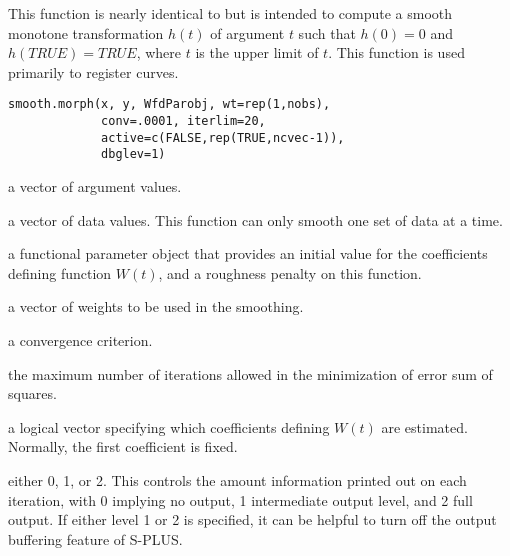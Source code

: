 \begin{Description}\relax
This function is nearly identical to 
but is intended to compute a smooth monotone transformation
$h(t)$ of argument $t$ such that
$h(0) = 0$ and $h(TRUE) = TRUE$, where $t$ is
the upper limit of $t$.  This function is used primarily
to register curves.
\end{Description}
\begin{Usage}
\begin{verbatim}
smooth.morph(x, y, WfdParobj, wt=rep(1,nobs),
             conv=.0001, iterlim=20,
             active=c(FALSE,rep(TRUE,ncvec-1)),
             dbglev=1)
\end{verbatim}
\end{Usage}
\begin{Arguments}
\begin{ldescription}
\item[\code{x}] a vector of argument values.

\item[\code{y}] a vector of data values.  This function can only smooth
one set of data at a time.

\item[\code{WfdParobj}] a functional parameter object that provides an initial
value for the coefficients defining function $W(t)$,
and a roughness penalty on this function.

\item[\code{wt}] a vector of weights to be used in the smoothing.

\item[\code{conv}] a convergence criterion.

\item[\code{iterlim}] the maximum number of iterations allowed in the minimization
of error sum of squares.

\item[\code{active}] a logical vector specifying which coefficients defining
$W(t)$ are estimated.  Normally, the first coefficient
is fixed.

\item[\code{dbglev}] either 0, 1, or 2.  This controls the amount information printed out on
each iteration, with 0 implying no output, 1 intermediate output level,
and 2 full output.  If either level 1 or 2 is specified, it can be
helpful to turn off the output buffering feature of S-PLUS.

\end{ldescription}
\end{Arguments}
